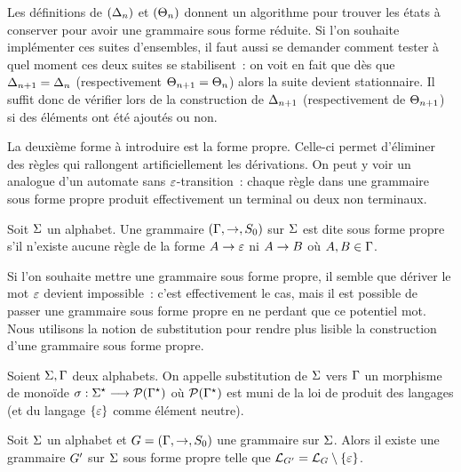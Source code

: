 \begin{remark}
  Les définitions de $(\Delta_n)$ et $(\Theta_n)$ donnent un algorithme pour trouver
  les états à conserver pour avoir une grammaire sous forme réduite. Si l'on
  souhaite implémenter ces suites d'ensembles, il faut aussi se demander comment
  tester à quel moment ces deux suites se stabilisent~: on voit en fait que dès
  que $\Delta_{n+1} = \Delta_n$ (respectivement $\Theta_{n+1}=\Theta_n$) alors la suite
  devient stationnaire. Il suffit donc de vérifier lors de la construction de
  $\Delta_{n+1}$ (respectivement de $\Theta_{n+1}$) si des éléments ont été ajoutés ou
  non.
\end{remark}

La deuxième forme à introduire est la forme propre. Celle-ci permet d'éliminer
des règles qui rallongent artificiellement les dérivations. On peut y voir un
analogue d'un automate sans $\varepsilon$-transition~: chaque règle dans une grammaire
sous forme propre produit effectivement un terminal ou deux non terminaux.

\begin{definition}
  Soit $\Sigma$ un alphabet. Une grammaire $(\Gamma,\to,S_{0})$ sur $\Sigma$ est dite
  sous forme propre s'il n'existe aucune règle de la forme $A \to \varepsilon$ ni
  $A \to B$ où $A,B\in\Gamma$.
\end{definition}

Si l'on souhaite mettre une grammaire sous forme propre, il semble que dériver
le mot $\varepsilon$ devient impossible~: c'est effectivement le cas, mais il est
possible de passer une grammaire sous forme propre en ne perdant que ce
potentiel mot. Nous utilisons la notion de substitution pour rendre plus lisible
la construction d'une grammaire sous forme propre.

\begin{definition}[Substitution]\label{def.ghc.subst}
  Soient $\Sigma, \Gamma$ deux alphabets. On appelle substitution de $\Sigma$ vers
  $\Gamma$ un morphisme de monoïde
  $\sigma : \displaystyle \Sigma^{\star} \longrightarrow \mathcal{P} (\Gamma^{\star})$ où $\mathcal{P}(\Gamma^{\star})$
  est muni de la loi de produit des langages (et du langage $\{\varepsilon\}$ comme
  élément neutre).
\end{definition}

\begin{proposition}
  Soit $\Sigma$ un alphabet et $G=(\Gamma,\to,S_{0})$ une grammaire sur $\Sigma$.
  Alors il existe une grammaire $G'$ sur $\Sigma$ sous forme propre telle que
  $\mathcal L_{G'} = \mathcal L_{G} \setminus \{\varepsilon\}$.
\end{proposition}

